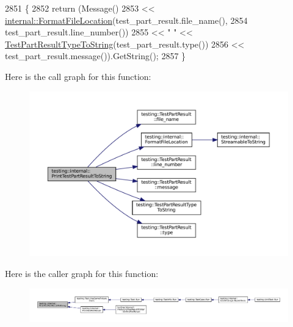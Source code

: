 \begin{DoxyCode}
2851                                             \{
2852   \textcolor{keywordflow}{return} (Message()
2853           << \hyperlink{namespacetesting_1_1internal_a31b7c3abed4a7c395f42c61e993989f4}{internal::FormatFileLocation}(test\_part\_result.file\_name(),
2854                                           test\_part\_result.line\_number())
2855           << \textcolor{stringliteral}{" "} << \hyperlink{namespacetesting_a4e9fdeef31f7e49afccfde0532f76864}{TestPartResultTypeToString}(test\_part\_result.type())
2856           << test\_part\_result.message()).GetString();
2857 \}
\end{DoxyCode}
Here is the call graph for this function\+:
\nopagebreak
\begin{figure}[H]
\begin{center}
\leavevmode
\includegraphics[width=350pt]{namespacetesting_1_1internal_ada13cbf91139f0809a5a31ea2594c1ad_cgraph}
\end{center}
\end{figure}
Here is the caller graph for this function\+:
\nopagebreak
\begin{figure}[H]
\begin{center}
\leavevmode
\includegraphics[width=350pt]{namespacetesting_1_1internal_ada13cbf91139f0809a5a31ea2594c1ad_icgraph}
\end{center}
\end{figure}
\mbox{\label{namespacetesting_1_1internal_aa74ea9d64f76ce69eceb225ca5ebef58}} 
